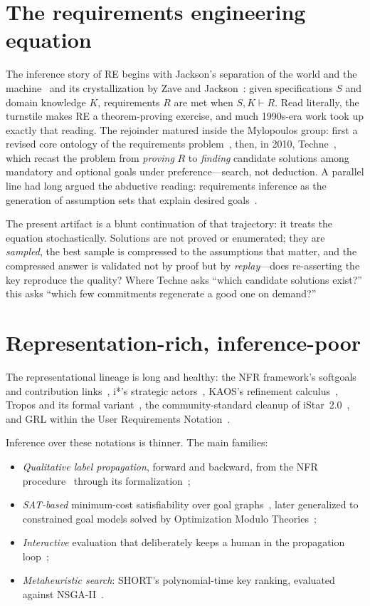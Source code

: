 \documentclass[sigconf,nonacm]{acmart}
\begin{document}
\section{The requirements engineering equation}

The inference story of RE begins with Jackson's separation of
the world and the machine~\cite{jackson95} and its
crystallization by Zave and Jackson~\cite{zave97}: given
specifications $S$ and domain knowledge $K$, requirements $R$
are met when $S,K \vdash R$. Read literally, the turnstile
makes RE a theorem-proving exercise, and much 1990s-era work
took up exactly that reading. The rejoinder matured inside the
Mylopoulos group: first a revised core ontology of the
requirements problem~\cite{jureta08}, then, in 2010, Techne~\cite{jureta10},
which recast the problem from \emph{proving} $R$ to
\emph{finding} candidate solutions among mandatory and optional
goals under preference---search, not deduction. A parallel
line had long argued the abductive reading: requirements
inference as the generation of assumption sets that explain
desired goals~\cite{menzies96}.

The present artifact is a blunt continuation of that
trajectory: it treats the equation stochastically. Solutions
are not proved or enumerated; they are \emph{sampled}, the best
sample is compressed to the assumptions that matter, and the
compressed answer is validated not by proof but by
\emph{replay}---does re-asserting the key reproduce the
quality? Where Techne asks ``which candidate solutions exist?''
this asks ``which few commitments regenerate a good one on
demand?''

\section{Representation-rich, inference-poor}

The representational lineage is long and healthy: the NFR
framework's softgoals and contribution links~\cite{chung00},
i*'s strategic actors~\cite{yu97}, KAOS's
refinement calculus~\cite{vanlam01}, Tropos and its formal
variant~\cite{fuxman04}, the community-standard cleanup of
iStar~2.0~\cite{dalpiaz16}, and GRL within the User
Requirements Notation~\cite{amyot10}.

Inference over these notations is thinner. The main families:

\begin{itemize}
\item \emph{Qualitative label propagation}, forward and
  backward, from the NFR procedure~\cite{chung00} through its
  formalization~\cite{giorgini02};
\item \emph{SAT-based} minimum-cost satisfiability over goal
  graphs~\cite{sebastiani04}, later generalized to
  constrained goal models solved by Optimization Modulo
  Theories~\cite{nguyen16};
\item \emph{Interactive} evaluation that deliberately keeps a
  human in the propagation loop~\cite{horkoff14};
\item \emph{Metaheuristic search}: SHORT's polynomial-time key
  ranking, evaluated against NSGA-II~\cite{mathew17}.
\end{itemize}
\end{document}

